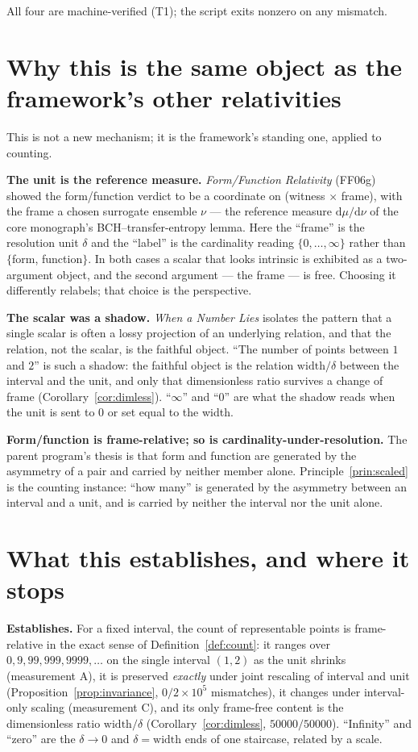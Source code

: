 \documentclass[11pt]{article}
\theoremstyle{definition}
\theoremstyle{plain}
\begin{document}
All four are machine-verified (T1); the script exits nonzero on any mismatch.

\section{Why this is the same object as the framework's other relativities}\label{sec:same}

This is not a new mechanism; it is the framework's standing one, applied to counting.

\textbf{The unit is the reference measure.} \textit{Form/Function Relativity} (FF06g) showed the
form/function verdict to be a coordinate on (witness $\times$ frame), with the frame a chosen surrogate
ensemble $\nu$ --- the reference measure $\mathrm{d}\mu/\mathrm{d}\nu$ of the core monograph's
BCH--transfer-entropy lemma. Here the ``frame'' is the resolution unit $\delta$ and the ``label'' is
the cardinality reading $\{0,\dots,\infty\}$ rather than $\{$form, function$\}$. In both cases a scalar
that looks intrinsic is exhibited as a two-argument object, and the second argument --- the frame --- is
free. Choosing it differently relabels; that choice is the perspective.

\textbf{The scalar was a shadow.} \textit{When a Number Lies} isolates the pattern that a single scalar
is often a lossy projection of an underlying relation, and that the relation, not the scalar, is the
faithful object. ``The number of points between $1$ and $2$'' is such a shadow: the faithful object is
the relation $\mathrm{width}/\delta$ between the interval and the unit, and only that dimensionless
ratio survives a change of frame (Corollary~\ref{cor:dimless}). ``$\infty$'' and ``$0$'' are what the
shadow reads when the unit is sent to $0$ or set equal to the width.

\textbf{Form/function is frame-relative; so is cardinality-under-resolution.} The parent program's
thesis is that form and function are generated by the asymmetry of a pair and carried by neither member
alone. Principle~\ref{prin:scaled} is the counting instance: ``how many'' is generated by the asymmetry
between an interval and a unit, and is carried by neither the interval nor the unit alone.

\section{What this establishes, and where it stops}\label{sec:scope}

\textbf{Establishes.} For a fixed interval, the count of representable points is frame-relative in the
exact sense of Definition~\ref{def:count}: it ranges over $0,9,99,999,9999,\dots$ on the single interval
$(1,2)$ as the unit shrinks (measurement A), it is preserved \emph{exactly} under joint rescaling of
interval and unit (Proposition~\ref{prop:invariance}, $0/2\!\times\!10^5$ mismatches), it changes under
interval-only scaling (measurement C), and its only frame-free content is the dimensionless ratio
$\mathrm{width}/\delta$ (Corollary~\ref{cor:dimless}, $50000/50000$). ``Infinity'' and ``zero'' are the
$\delta\to0$ and $\delta=\mathrm{width}$ ends of one staircase, related by a scale.
\end{document}
